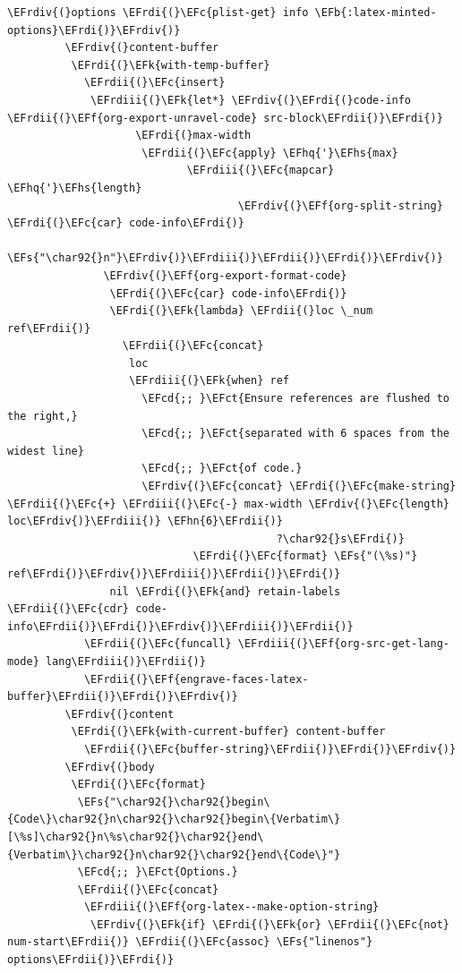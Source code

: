 \documentclass{scrartcl}
\newcommand{\EFk}[1]{\textcolor{EFk}{#1}} %
\newcommand{\EFs}[1]{\textcolor{EFs}{#1}} %
\newcommand{\EFb}[1]{\textcolor{EFb}{#1}} %
\newcommand{\EFct}[1]{\textcolor{EFct}{#1}} %
\newcommand{\EFc}[1]{\textcolor{EFc}{#1}} %
\newcommand{\EFf}[1]{\textcolor{EFf}{#1}} %
\newcommand{\EFcd}[1]{\textcolor{EFcd}{#1}} %
\newcommand{\EFhn}[1]{#1} %
\newcommand{\EFhq}[1]{#1} %
\newcommand{\EFhs}[1]{#1} %
\newcommand{\EFrdi}[1]{#1} %
\newcommand{\EFrdii}[1]{#1} %
\newcommand{\EFrdiii}[1]{#1} %
\newcommand{\EFrdiv}[1]{#1} %
\begin{document}
\begin{Code}
\begin{Verbatim}[]
         \EFrdiv{(}options \EFrdi{(}\EFc{plist-get} info \EFb{:latex-minted-options}\EFrdi{)}\EFrdiv{)}
         \EFrdiv{(}content-buffer
          \EFrdi{(}\EFk{with-temp-buffer}
            \EFrdii{(}\EFc{insert}
             \EFrdiii{(}\EFk{let*} \EFrdiv{(}\EFrdi{(}code-info \EFrdii{(}\EFf{org-export-unravel-code} src-block\EFrdii{)}\EFrdi{)}
                    \EFrdi{(}max-width
                     \EFrdii{(}\EFc{apply} \EFhq{'}\EFhs{max}
                            \EFrdiii{(}\EFc{mapcar} \EFhq{'}\EFhs{length}
                                    \EFrdiv{(}\EFf{org-split-string} \EFrdi{(}\EFc{car} code-info\EFrdi{)}
                                                      \EFs{"\char92{}n"}\EFrdiv{)}\EFrdiii{)}\EFrdii{)}\EFrdi{)}\EFrdiv{)}
               \EFrdiv{(}\EFf{org-export-format-code}
                \EFrdi{(}\EFc{car} code-info\EFrdi{)}
                \EFrdi{(}\EFk{lambda} \EFrdii{(}loc \_num ref\EFrdii{)}
                  \EFrdii{(}\EFc{concat}
                   loc
                   \EFrdiii{(}\EFk{when} ref
                     \EFcd{;; }\EFct{Ensure references are flushed to the right,}
                     \EFcd{;; }\EFct{separated with 6 spaces from the widest line}
                     \EFcd{;; }\EFct{of code.}
                     \EFrdiv{(}\EFc{concat} \EFrdi{(}\EFc{make-string} \EFrdii{(}\EFc{+} \EFrdiii{(}\EFc{-} max-width \EFrdiv{(}\EFc{length} loc\EFrdiv{)}\EFrdiii{)} \EFhn{6}\EFrdii{)}
                                          ?\char92{}s\EFrdi{)}
                             \EFrdi{(}\EFc{format} \EFs{"(\%s)"} ref\EFrdi{)}\EFrdiv{)}\EFrdiii{)}\EFrdii{)}\EFrdi{)}
                nil \EFrdi{(}\EFk{and} retain-labels \EFrdii{(}\EFc{cdr} code-info\EFrdii{)}\EFrdi{)}\EFrdiv{)}\EFrdiii{)}\EFrdii{)}
            \EFrdii{(}\EFc{funcall} \EFrdiii{(}\EFf{org-src-get-lang-mode} lang\EFrdiii{)}\EFrdii{)}
            \EFrdii{(}\EFf{engrave-faces-latex-buffer}\EFrdii{)}\EFrdi{)}\EFrdiv{)}
         \EFrdiv{(}content
          \EFrdi{(}\EFk{with-current-buffer} content-buffer
            \EFrdii{(}\EFc{buffer-string}\EFrdii{)}\EFrdi{)}\EFrdiv{)}
         \EFrdiv{(}body
          \EFrdi{(}\EFc{format}
           \EFs{"\char92{}\char92{}begin\{Code\}\char92{}n\char92{}\char92{}begin\{Verbatim\}[\%s]\char92{}n\%s\char92{}\char92{}end\{Verbatim\}\char92{}n\char92{}\char92{}end\{Code\}"}
           \EFcd{;; }\EFct{Options.}
           \EFrdii{(}\EFc{concat}
            \EFrdiii{(}\EFf{org-latex--make-option-string}
             \EFrdiv{(}\EFk{if} \EFrdi{(}\EFk{or} \EFrdii{(}\EFc{not} num-start\EFrdii{)} \EFrdii{(}\EFc{assoc} \EFs{"linenos"} options\EFrdii{)}\EFrdi{)}

\end{Verbatim}
\end{Code}
\end{document}
